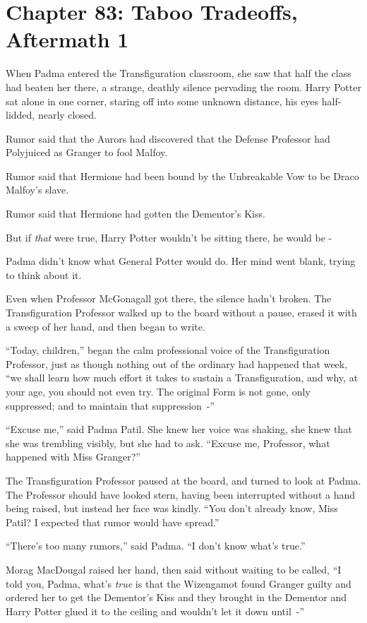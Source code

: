 \chapter{Chapter 83: Taboo Tradeoffs, Aftermath 1}
When Padma entered the Transfiguration classroom, she saw that half the class had beaten her there, a strange, deathly silence pervading the room. Harry Potter sat alone in one corner, staring off into some unknown distance, his eyes half-lidded, nearly closed.

Rumor said that the Aurors had discovered that the Defense Professor had Polyjuiced as Granger to fool Malfoy.

Rumor said that Hermione had been bound by the Unbreakable Vow to be Draco Malfoy's slave.

Rumor said that Hermione had gotten the Dementor's Kiss.

But if \emph{that} were true, Harry Potter wouldn't be sitting there, he would be -

Padma didn't know what General Potter would do. Her mind went blank, trying to think about it.

Even when Professor McGonagall got there, the silence hadn't broken. The Transfiguration Professor walked up to the board without a pause, erased it with a sweep of her hand, and then began to write.

``Today, children,'' began the calm professional voice of the Transfiguration Professor, just as though nothing out of the ordinary had happened that week, ``we shall learn how much effort it takes to sustain a Transfiguration, and why, at your age, you should not even try. The original Form is not gone, only suppressed; and to maintain that suppression~-''

``Excuse me,'' said Padma Patil. She knew her voice was shaking, she knew that she was trembling visibly, but she had to ask. ``Excuse me, Professor, what happened with Miss Granger?''

The Transfiguration Professor paused at the board, and turned to look at Padma. The Professor should have looked stern, having been interrupted without a hand being raised, but instead her face was kindly. ``You don't already know, Miss Patil? I expected that rumor would have spread.''

``There's too many rumors,'' said Padma. ``I don't know what's true.''

Morag MacDougal raised her hand, then said without waiting to be called, ``I told you, Padma, what's \emph{true} is that the Wizengamot found Granger guilty and ordered her to get the Dementor's Kiss and they brought in the Dementor and Harry Potter glued it to the ceiling and wouldn't let it down until~-''

